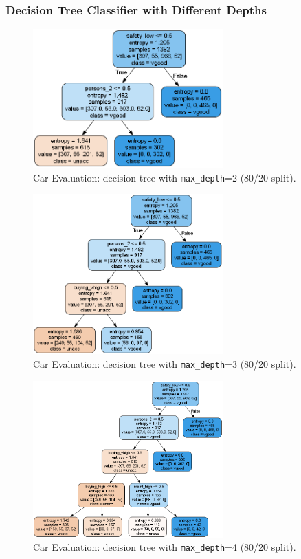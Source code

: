 \clearpage
\subsubsection*{Decision Tree Classifier with Different Depths}
\begin{figure}[H]
	\centering
	\includegraphics[width=0.65\textwidth]{imgs/dt-mini/dt__car_evaluation__80_vs_20__2.png}
	\caption{Car Evaluation: decision tree with \texttt{max\_depth}=2 (80/20 split).}\label{fig:ce-dt-depth-2}
\end{figure}

\begin{figure}[H]
	\centering
	\includegraphics[width=0.65\textwidth]{imgs/dt-mini/dt__car_evaluation__80_vs_20__3.png}
	\caption{Car Evaluation: decision tree with \texttt{max\_depth}=3 (80/20 split).}\label{fig:ce-dt-depth-3}
\end{figure}

\begin{figure}[H]
	\centering
	\includegraphics[width=0.65\textwidth]{imgs/dt-mini/dt__car_evaluation__80_vs_20__4.png}
	\caption{Car Evaluation: decision tree with \texttt{max\_depth}=4 (80/20 split).}\label{fig:ce-dt-depth-4}
\end{figure}

